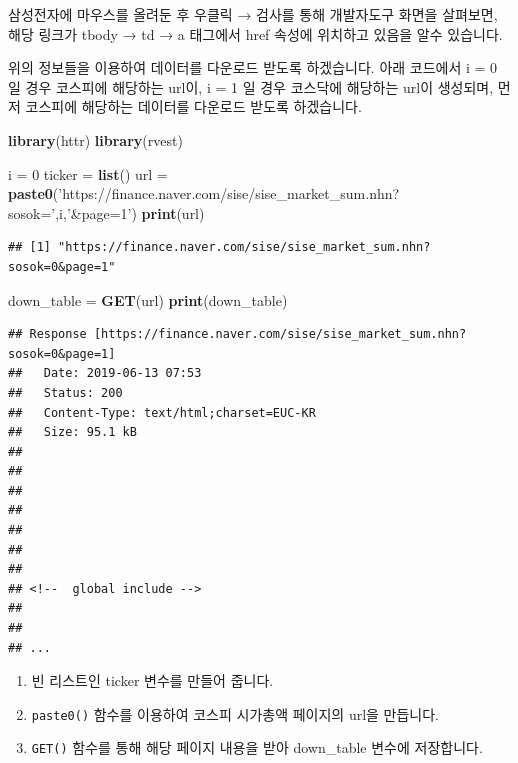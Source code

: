 \documentclass[]{book}
\newenvironment{Shaded}{\begin{snugshade}}{\end{snugshade}}
\newcommand{\DecValTok}[1]{\textcolor[rgb]{0.00,0.00,0.81}{#1}}
\newcommand{\KeywordTok}[1]{\textcolor[rgb]{0.13,0.29,0.53}{\textbf{#1}}}
\newcommand{\NormalTok}[1]{#1}
\newcommand{\StringTok}[1]{\textcolor[rgb]{0.31,0.60,0.02}{#1}}
\providecommand{\tightlist}{%
  \setlength{\itemsep}{0pt}\setlength{\parskip}{0pt}}
\begin{document}
삼성전자에 마우스를 올려둔 후 우클릭 → 검사를 통해 개발자도구 화면을 살펴보면, 해당 링크가 tbody → td → a 태그에서 href 속성에 위치하고 있음을 알수 있습니다.

위의 정보들을 이용하여 데이터를 다운로드 받도록 하겠습니다. 아래 코드에서 i = 0 일 경우 코스피에 해당하는 url이, i = 1 일 경우 코스닥에 해당하는 url이 생성되며, 먼저 코스피에 해당하는 데이터를 다운로드 받도록 하겠습니다.

\begin{Shaded}
\begin{Highlighting}[]
\KeywordTok{library}\NormalTok{(httr)}
\KeywordTok{library}\NormalTok{(rvest)}

\NormalTok{i =}\StringTok{ }\DecValTok{0}
\NormalTok{ticker =}\StringTok{ }\KeywordTok{list}\NormalTok{()}
\NormalTok{url =}\StringTok{ }\KeywordTok{paste0}\NormalTok{(}\StringTok{'https://finance.naver.com/sise/sise_market_sum.nhn?sosok='}\NormalTok{,i,}\StringTok{'&page=1'}\NormalTok{)}
\KeywordTok{print}\NormalTok{(url)}
\end{Highlighting}
\end{Shaded}

\begin{verbatim}
## [1] "https://finance.naver.com/sise/sise_market_sum.nhn?sosok=0&page=1"
\end{verbatim}

\begin{Shaded}
\begin{Highlighting}[]
\NormalTok{down_table =}\StringTok{ }\KeywordTok{GET}\NormalTok{(url)}
\KeywordTok{print}\NormalTok{(down_table)}
\end{Highlighting}
\end{Shaded}

\begin{verbatim}
## Response [https://finance.naver.com/sise/sise_market_sum.nhn?sosok=0&page=1]
##   Date: 2019-06-13 07:53
##   Status: 200
##   Content-Type: text/html;charset=EUC-KR
##   Size: 95.1 kB
## 
## 
## 
## 
## 
## 
## 
## <!--  global include -->
## 
##  
## ...
\end{verbatim}

\begin{enumerate}
\def\labelenumi{\arabic{enumi}.}
\tightlist
\item
  빈 리스트인 ticker 변수를 만들어 줍니다.
\item
  \texttt{paste0()} 함수를 이용하여 코스피 시가총액 페이지의 url을 만듭니다.
\item
  \texttt{GET()} 함수를 통해 해당 페이지 내용을 받아 down\_table 변수에 저장합니다.
\end{enumerate}
\end{document}
